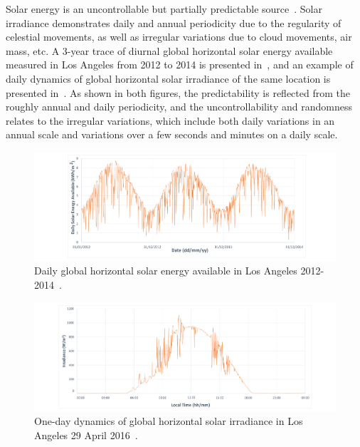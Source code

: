 Solar energy is an uncontrollable but partially predictable source~\cite{heinemann2006forecasting, buchli2014dynamic}. Solar irradiance demonstrates daily and annual periodicity due to the regularity of celestial movements, as well as irregular variations due to cloud movements, air mass, etc. A 3-year trace of diurnal global horizontal solar energy available measured in Los Angeles from 2012 to 2014 is presented in~, and an example of daily dynamics of global horizontal solar irradiance of the same location is presented in~. As shown in both figures, the predictability is reflected from the roughly annual and daily periodicity, and the uncontrollability and randomness relates to the irregular variations, which include both daily variations in an annual scale and variations over a few seconds and minutes on a daily scale. 

\begin{figure}[!htb]
    \centering
    \includegraphics[width=14cm]{ch2_review/figures/solar_calendar}
    \caption{Daily global horizontal solar energy available in Los Angeles 2012-2014~\cite{nreldata}.}
    \label{Figure:solar_calendar}
\end{figure}

\begin{figure}[!htb]
    \centering
    \includegraphics[width=14cm]{ch2_review/figures/solar_plots}
    \caption{One-day dynamics of global horizontal solar irradiance in Los Angeles 29 April 2016~\cite{lmu}.}
    \label{Figure:solar_plots}
\end{figure}

